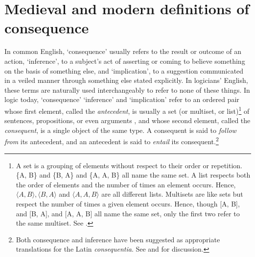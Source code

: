 \documentclass[]{article}
\begin{document}
\section{Medieval and modern definitions of consequence}
In common English, `consequence' usually refers to the result or outcome of an action, `inference', to a subject's act of asserting or coming to believe something on the basis of something else, and `implication', to a suggestion communicated in a veiled manner through something else stated explicitly. In logicians' English, these terms are naturally used interchangeably to refer to none of these things. In logic today, `consequence' `inference' and `implication' refer to an ordered pair whose first element, called the \textit{antecedent}, is usually a set (or multiset, or list)\footnote{A set is a grouping of elements without respect to their order or repetition. \{A, B\} and \{B, A\} and \{A, A, B\} all name the same set. A list respects both the order of elements and the number of times an element occurs. Hence, $\langle A, B\rangle, \langle B, A \rangle$ and $\langle A, A, B \rangle$ are all different lists. Multisets are like sets but respect the number of times a given element occurs. Hence, though [A, B], and [B, A], and [A, A, B] all name the same set, only the first two refer to the same multiset. See \autocite[300]{Ripley2015}.} of sentences, propositions, or even arguments \autocite{Garson2013}, and whose second element, called the \textit{consequent}, is a single object of the same type. A consequent is said to \textit{follow from} its antecedent, and an antecedent is said to \textit{entail} its consequent.\footnote{Both consequence and inference have been suggested as appropriate translations for the Latin \textit{consequentia}. See \autocite{King2001} and \autocite{DutilhNovaes2005} for discussion.}
\end{document}
